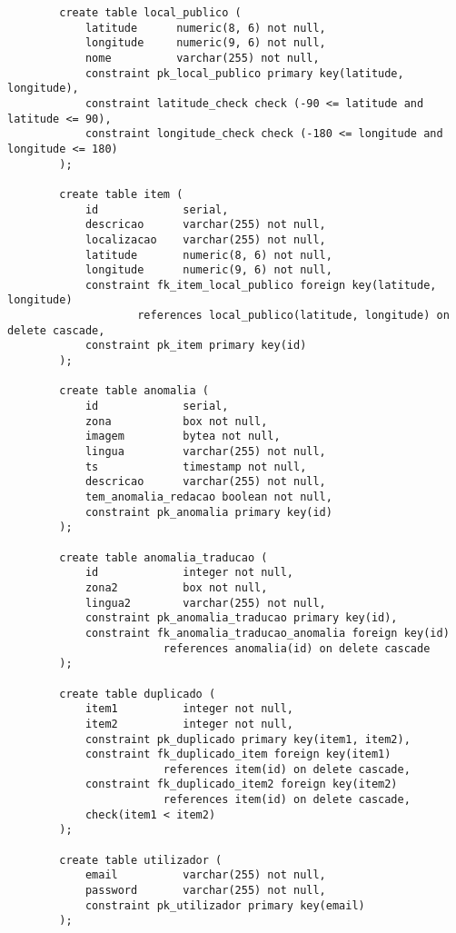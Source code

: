\documentclass[12pt]{report}
\begin{document}
    \small
    \begin{verbatim}
        create table local_publico (
            latitude      numeric(8, 6) not null,
            longitude     numeric(9, 6) not null,
            nome          varchar(255) not null,
            constraint pk_local_publico primary key(latitude, longitude),
            constraint latitude_check check (-90 <= latitude and latitude <= 90),
            constraint longitude_check check (-180 <= longitude and longitude <= 180)
        );

        create table item (
            id             serial,
            descricao      varchar(255) not null,
            localizacao    varchar(255) not null,
            latitude       numeric(8, 6) not null,
            longitude      numeric(9, 6) not null,
            constraint fk_item_local_publico foreign key(latitude, longitude)
                    references local_publico(latitude, longitude) on delete cascade,
            constraint pk_item primary key(id)
        );

        create table anomalia (
            id             serial,
            zona           box not null,
            imagem         bytea not null,
            lingua         varchar(255) not null,
            ts             timestamp not null,
            descricao      varchar(255) not null,
            tem_anomalia_redacao boolean not null,
            constraint pk_anomalia primary key(id)
        );

        create table anomalia_traducao (
            id             integer not null,
            zona2          box not null,
            lingua2        varchar(255) not null,
            constraint pk_anomalia_traducao primary key(id),
            constraint fk_anomalia_traducao_anomalia foreign key(id)
                        references anomalia(id) on delete cascade
        );

        create table duplicado (
            item1          integer not null,
            item2          integer not null,
            constraint pk_duplicado primary key(item1, item2),
            constraint fk_duplicado_item foreign key(item1)
                        references item(id) on delete cascade,
            constraint fk_duplicado_item2 foreign key(item2)
                        references item(id) on delete cascade,
            check(item1 < item2)
        );

        create table utilizador (
            email          varchar(255) not null,
            password       varchar(255) not null,
            constraint pk_utilizador primary key(email)
        );


\end{verbatim}
\end{document}
